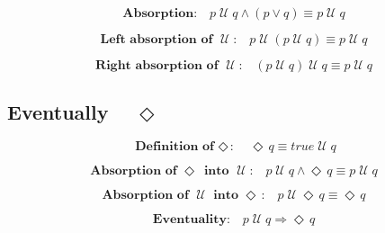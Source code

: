 \documentclass[12pt, fleqn, leqno]{article}
\newcommand{\impl}{\ensuremath{\Rightarrow}}        %
\newcommand{\Until}{\;\mathcal{U}\;}
\newcommand{\Event}{\Diamond\,}
\newcommand{\spacer}{\vspace{-30pt}}
\newcommand{\firstspacer}{\vspace{-26pt}}
\begin{document}
\begin{equation}\label{E:untilAndOr}
\textbf{Absorption:}\quad p \Until q \land (p \lor q) \equiv p \Until q
\end{equation}

\spacer

\begin{equation}\label{E:untilIdem}
\textbf{Left absorption of $\Until$:}\quad p \Until (p \Until q) \equiv p \Until q
\end{equation}

\spacer

\begin{equation}\label{E:untilIdemR}
\textbf{Right absorption of $\Until$:}\quad (p \Until q) \Until q \equiv p \Until q
\end{equation}

\newpage

\subsection*{Eventually $\quad\Event$}

\begin{equation}\label{E:defEvent}
\textbf{Definition of $\Event$:}\quad \Event q \equiv true \Until q
\end{equation}

\firstspacer

\begin{equation}\label{E:absEventIntoUntil}
\textbf{Absorption of $\Event$ into $\Until$:}\quad p \Until q\land \Event q \equiv p\Until q
\end{equation}

\spacer

\begin{equation}\label{E:absUntilIntoEvent}
\textbf{Absorption of $\Until$ into $\Event$:}\quad p \Until \Event q \equiv \Event q
\end{equation}

\spacer

\begin{equation}\label{E:eventuality}
\textbf{Eventuality:}\quad p \Until q \impl \Event q
\end{equation}
\end{document}
